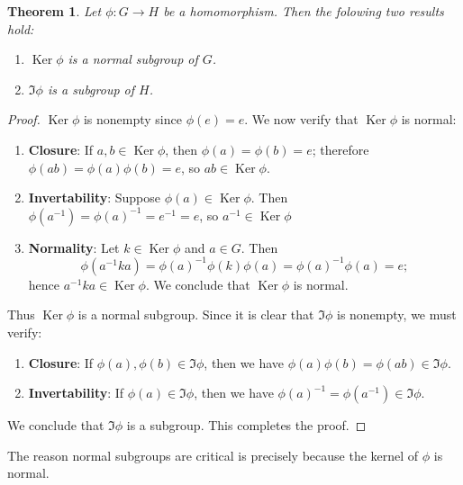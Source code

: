 \documentclass[11pt]{article}
\newtheorem{theorem}{Theorem}
\newcommand{\Ker}{\operatorname{Ker}}
\begin{document}
\begin{adjustwidth}{0.5cm}{}
  \begin{theorem}
    Let $\phi : G \to H$ be a homomorphism. Then the folowing two results hold:
    \begin{enumerate}
      \item $\Ker \phi$ is a normal subgroup of $G$.
      \item $\Im \phi$ is a subgroup of $H$.
    \end{enumerate}
  \end{theorem}
  \begin{proof}
    $\Ker \phi$ is nonempty since $\phi(e) = e$. We now verify that $\Ker \phi$ is normal:
    \begin{enumerate}
      \item \textbf{Closure}: If $a, b \in \Ker \phi$, then $\phi(a) = \phi(b) = e$; therefore $\phi(ab) = \phi(a) \phi(b) = e$, so $ab \in \Ker \phi$.
      \item \textbf{Invertability}: Suppose $\phi(a) \in \Ker \phi$. Then $\phi(a^{-1}) = \phi(a)^{-1} = e^{-1} = e$, so $a^{-1} \in \Ker \phi$
      \item \textbf{Normality}: Let $k \in \Ker \phi$ and $a \in G$. Then
      \[
        \phi(a^{-1}ka) = \phi(a)^{-1} \phi(k) \phi(a) = \phi(a)^{-1} \phi(a) = e;
      \]
      hence $a^{-1}ka \in \Ker \phi$. We conclude that $\Ker \phi$ is normal. 
    \end{enumerate}
    Thus $\Ker \phi$ is a normal subgroup. Since it is clear that $\Im \phi$ is nonempty, we must verify:
    \begin{enumerate}
      \item \textbf{Closure}: If $\phi(a), \phi(b) \in \Im \phi$, then we have $\phi(a) \phi(b) = \phi(ab) \in \Im \phi$.
      \item \textbf{Invertability}: If $\phi(a) \in \Im \phi$, then we have $\phi(a)^{-1} = \phi(a^{-1}) \in \Im \phi$.
    \end{enumerate}
    We conclude that $\Im \phi$ is a subgroup. This completes the proof.
  \end{proof}
\end{adjustwidth}

The reason normal subgroups are critical is precisely because the kernel of $\phi$ is normal.

\newpage
\end{document}
